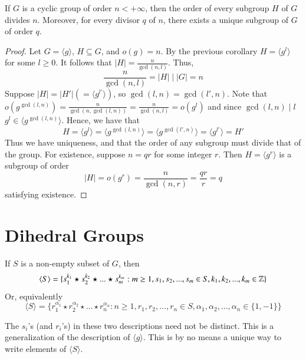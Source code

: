 \documentclass[12pt, a4paper, oneside, openright, titlepage]{book}
\begin{document}
\begin{thm}
        If $G$ is a cyclic group of order $n < +\infty$, then the order of every subgroup $H$ of $G$ divides $n$. Moreover, for every divisor $q$ of $n$, there exists a unique subgroup of $G$ of order $q$.
\end{thm}
\begin{proof}
        Let $G = \langle g \rangle$, $H \subseteq G$, and $o(g) = n$. By the previous corollary $H = \langle g^l \rangle$ for some $l \geq 0$. It follows that $|H| = \frac{n}{\gcd(n,l)}$. Thus, $$\frac{n}{\gcd(n,l)} = |H|\;\vert\;|G| = n$$ Suppose $|H| = |H'| (=\langle g^{l'}\rangle)$, so $\gcd(l,n) = \gcd(l',n)$. Note that $o(g^{\gcd(l,n)}) = \frac{n}{\gcd(n,\gcd(l,n))} = \frac{n}{\gcd(n,l)} = o(g^l)$ and since $\gcd(l,n)\;\vert\;l$ $g^l \in \langle g^{\gcd(l,n)}\rangle$. Hence, we have that \begin{equation}
                H = \langle g^l \rangle = \langle g^{\gcd(l,n)} \rangle = \langle g^{\gcd(l',n)} \rangle = \langle g^{l'} \rangle = H'
        \end{equation}
        Thus we have uniqueness, and that the order of any subgroup must divide that of the group. For existence, suppose $n = qr$ for some integer $r$. Then $H = \langle g^r\rangle$ is a subgroup of order $$|H| = o(g^r) = \frac{n}{\gcd(n,r)} = \frac{qr}{r} = q$$ satisfying existence.
\end{proof}



\section{\textsection Dihedral Groups}

\begin{claim}
    If $S$ is a non-empty subset of $G$, then \begin{equation}
        \langle S\rangle = \{s_1^{k_1}\star s_2^{k_2} \star ... \star s_m^{k_m}: m\geq 1, s_1,s_2,...,s_m \in S,k_1,k_2,...,k_m\in\mathbb Z\}
    \end{equation}
    Or, equivalently \begin{equation}
        \langle S\rangle = \{r_1^{\alpha_1}\star r_2^{\alpha_2} \star ... \star r_n^{\alpha_n}: n\geq 1, r_1,r_2,...,r_n \in S,\alpha_1,\alpha_2,...,\alpha_n\in\{1,-1\}\}
    \end{equation}
\end{claim}

\begin{rmk}
    The $s_i$'s (and $r_i$'s) in these two descriptions need not be distinct. This is a generalization of the description of $\langle g \rangle$. This is by no means a unique way to write elements of $\langle S\rangle$.
\end{rmk}
\end{document}
